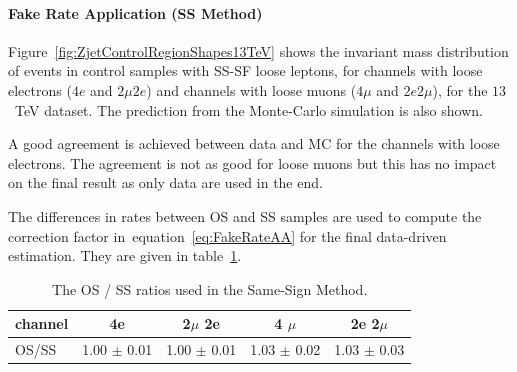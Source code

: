 
\paragraph{Fake Rate Application (SS Method)}
Figure~\ref{fig:ZjetControlRegionShapes13TeV} shows the invariant mass
distribution of events in control samples with SS-SF loose leptons,
for channels with loose electrons ($4e$ and $2\mu2e$) and channels
with loose muons ($4\mu$ and $2e2\mu$), for the $13$~TeV dataset. 
The prediction from the Monte-Carlo simulation is also shown.

A good agreement is achieved between data and MC for the channels
with loose electrons. The agreement is not as good for loose muons
but this has no impact on the final result as only data are used in the end.  

The differences in rates between OS and SS samples are used to
 compute the correction factor in~equation~\ref{eq:FakeRateAA} for the
 final data-driven estimation. They are given in table~\ref{tab:OSSS}.

\begin{table}[h]
\begin{center}
    \begin{tabular}{ | l | c | c | c |  c | }  \hline
   channel  &  4e  &  2$\mu$ 2e   &  4 $\mu$   &   2e 2$\mu$   \\ \hline
   
   OS/SS    &  1.00 $\pm$ 0.01  &  1.00 $\pm$ 0.01   &  1.03 $\pm$ 0.02  &  1.03 $\pm$ 0.03 \\ \hline
        \end{tabular} 
    \caption{ The OS / SS ratios used in the Same-Sign Method. }
    \label{tab:OSSS}
\end{center}
\end{table}


